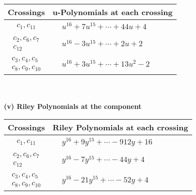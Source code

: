 \documentclass[1p]{elsarticle_modified}
\theoremstyle{definition}
\begin{document}
\begin{tabular}{m{50pt}|m{274pt}}
Crossings & \hspace{64pt}u-Polynomials at each crossing \\
\hline $$\begin{aligned}c_{1},c_{11}\end{aligned}$$&$\begin{aligned}
&u^{16}+7 u^{15}+\cdots+44 u+4
\end{aligned}$\\
\hline $$\begin{aligned}c_{2},c_{6},c_{7}\\c_{12}\end{aligned}$$&$\begin{aligned}
&u^{16}-3 u^{15}+\cdots+2 u+2
\end{aligned}$\\
\hline $$\begin{aligned}c_{3},c_{4},c_{5}\\c_{8},c_{9},c_{10}\end{aligned}$$&$\begin{aligned}
&u^{16}+3 u^{15}+\cdots+13 u^2-2
\end{aligned}$\\
\hline
\end{tabular}\\~\\
\newpage\renewcommand{\arraystretch}{1}
\flushleft \textbf{(v) Riley Polynomials at the component}\newline \\
\begin{tabular}{m{50pt}|m{274pt}}
Crossings & \hspace{64pt}Riley Polynomials at each crossing \\
\hline $$\begin{aligned}c_{1},c_{11}\end{aligned}$$&$\begin{aligned}
&y^{16}+9 y^{15}+\cdots-912 y+16
\end{aligned}$\\
\hline $$\begin{aligned}c_{2},c_{6},c_{7}\\c_{12}\end{aligned}$$&$\begin{aligned}
&y^{16}-7 y^{15}+\cdots-44 y+4
\end{aligned}$\\
\hline $$\begin{aligned}c_{3},c_{4},c_{5}\\c_{8},c_{9},c_{10}\end{aligned}$$&$\begin{aligned}
&y^{16}-21 y^{15}+\cdots-52 y+4
\end{aligned}$\\
\hline
\end{tabular}\\~\\
\end{document}
